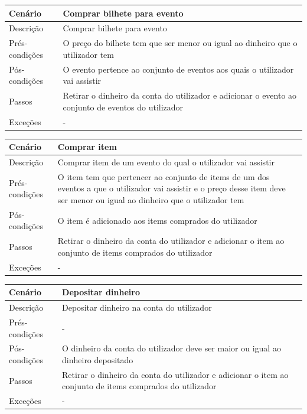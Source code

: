 \documentclass{article}
\begin{document}
\begin{center}
\begin{tabular}{ |p{2.5cm}|p{9cm}| }
\hline
 Cenário & Comprar bilhete para evento \\
\hline
Descrição & Comprar bilhete para evento\\
\hline
 Prés-condições &  O preço do bilhete tem que ser menor ou igual ao dinheiro que o utilizador tem\\
\hline
Pós-condições & O evento pertence ao conjunto de eventos aos quais o utilizador vai assistir\\
\hline
Passos &  Retirar o dinheiro da conta do utilizador e adicionar o evento ao conjunto de eventos do utilizador\\
\hline
Exceções & -\\
\hline
\end{tabular}
\end{center}

\begin{center}
\begin{tabular}{ |p{2.5cm}|p{9cm}| }
\hline
 Cenário & Comprar item \\
\hline
Descrição & Comprar item de um evento do qual o utilizador vai assistir\\
\hline
 Prés-condições &  O item tem que pertencer ao conjunto de items de um dos eventos a que o utilizador vai assistir e o preço desse item deve ser menor ou igual ao dinheiro que o utilizador tem\\
\hline
Pós-condições & O item é adicionado aos items comprados do utilizador\\
\hline
Passos &  Retirar o dinheiro da conta do utilizador e adicionar o item ao conjunto de items comprados do utilizador\\
\hline
Exceções & -\\
\hline
\end{tabular}
\end{center}

\begin{center}
\begin{tabular}{ |p{2.5cm}|p{9cm}| }
\hline
 Cenário & Depositar dinheiro \\
\hline
Descrição & Depositar dinheiro na conta do utilizador\\
\hline
 Prés-condições &  -\\
\hline
Pós-condições & O dinheiro da conta do utilizador deve ser maior ou igual ao dinheiro depositado\\
\hline
Passos &  Retirar o dinheiro da conta do utilizador e adicionar o item ao conjunto de items comprados do utilizador\\
\hline
Exceções & -\\
\hline
\end{tabular}
\end{center}
\end{document}
